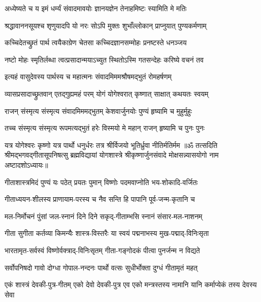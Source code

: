 \twolineshloka
{अध्येष्यते च य इमं धर्म्यं संवादमावयोः}
{ज्ञानयज्ञेन तेनाहमिष्टः स्यामिति मे मतिः}%

\twolineshloka
{श्रद्धावाननसूयश्च शृणुयादपि यो नरः}
{सोऽपि मुक्तः शुभाँल्लोकान् प्राप्नुयात् पुण्यकर्मणाम्}%

\twolineshloka
{कच्चिदेतच्छ्रुतं पार्थ त्वयैकाग्रेण चेतसा}
{कच्चिदज्ञानसम्मोहः प्रनष्टस्ते धनञ्जय}%

\twolineshloka
{नष्टो मोहः स्मृतिर्लब्धा त्वत्प्रसादान्मयाऽच्युत}
{स्थितोऽस्मि गतसन्देहः करिष्ये वचनं तव}%

\twolineshloka
{इत्यहं वासुदेवस्य पार्थस्य च महात्मनः}
{संवादमिममश्रौषमद्भुतं रोमहर्षणम्}%

\twolineshloka
{व्यासप्रसादाच्छ्रुतवान् एतद्गुह्यमहं परम्}
{योगं योगेश्वरात् कृष्णात् साक्षात् कथयतः स्वयम्}%

\twolineshloka
{राजन् संस्मृत्य संस्मृत्य संवादमिममद्भुतम्}
{केशवार्जुनयोः पुण्यं हृष्यामि च मुहुर्मुहुः}%

\twolineshloka
{तच्च संस्मृत्य संस्मृत्य रूपमत्यद्भुतं हरेः}
{विस्मयो मे महान् राजन् हृष्यामि च पुनः पुनः}%

\twolineshloka
{यत्र योगेश्वरः कृष्णो यत्र पार्थो धनुर्धरः}
{तत्र श्रीर्विजयो भूतिर्ध्रुवा नीतिर्मतिर्मम}%
{॥ॐ तत्सदिति श्रीमद्भगवद्गीतासूपनिषत्सु ब्रह्मविद्यायां योगशास्त्रे श्रीकृष्णार्जुनसंवादे मोक्षसन्न्यासयोगो नाम अष्टादशोऽध्यायः॥}

\closesection
\resetShloka
{}
\twolineshloka
{गीताशास्त्रमिदं पुण्यं यः पठेत् प्रयतः पुमान्}
{विष्णोः पदमवाप्नोति भय-शोकादि-वर्जितः}%

\twolineshloka
{गीताध्ययन-शीलस्य प्राणायाम-परस्य च}
{नैव सन्ति हि पापानि पूर्व-जन्म-कृतानि च}%

\twolineshloka
{मल-निर्मोचनं पुंसां जल-स्नानं दिने दिने}
{सकृद्-गीताम्भसि स्नानं संसार-मल-नाशनम्}%

\twolineshloka
{गीता सुगीता कर्तव्या किमन्यैः शास्त्र-विस्तरैः}
{या स्वयं पद्मनाभस्य मुख-पद्माद्-विनिःसृता}%

\twolineshloka
{भारतामृत-सर्वस्वं विष्णोर्वक्त्राद्-विनिःसृतम्}
{गीता-गङ्गोदकं पीत्वा पुनर्जन्म न विद्यते}%

\twolineshloka
{सर्वोपनिषदो गावो दोग्धा गोपाल-नन्दनः}
{पार्थो वत्सः सुधीर्भोक्ता दुग्धं गीतामृतं महत्}%

\fourlineindentedshloka
{एकं शास्त्रं देवकी-पुत्र-गीतम्}
{एको देवो देवकी-पुत्र एव}
{एको मन्त्रस्तस्य नामानि यानि}
{कर्माप्येकं तस्य देवस्य सेवा}%
